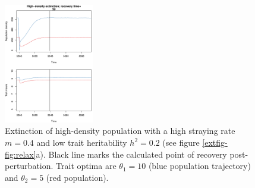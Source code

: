 \documentclass{revtex4}
\begin{document}
\begin{figure}
  \captionsetup{justification=raggedright,
singlelinecheck=false
}
\centering
\includegraphics[width=0.35\textwidth]{fig_relax_large.pdf}
\caption{
Extinction of high-density population with a high straying rate $m=0.4$ and low trait heritability $h^2=0.2$ (see figure \ref{extfig-fig:relax}a).
Black line marks the calculated point of recovery post-perturbation.
Trait optima are $\theta_1 = 10$ (blue population trajectory) and $\theta_2 = 5$ (red population).
} \label{fig:relaxtraj_hdlh}
\end{figure}
% 
% 
\end{document}
